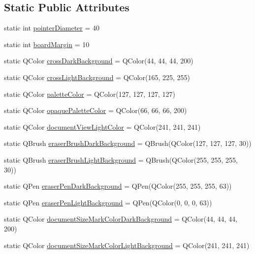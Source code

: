 \subsection*{Static Public Attributes}
\begin{DoxyCompactItemize}
\item 
static int \hyperlink{class_u_b_settings_a5e5079f8062a48661b0a60b3656fc7c1}{pointer\-Diameter} = 40
\item 
static int \hyperlink{class_u_b_settings_aff1d52afbc3bda4b82ad2bba4d7f86b0}{board\-Margin} = 10
\item 
static Q\-Color \hyperlink{class_u_b_settings_abb114084da6714ad6196e6af1a6d2760}{cross\-Dark\-Background} = Q\-Color(44, 44, 44, 200)
\item 
static Q\-Color \hyperlink{class_u_b_settings_a0c8533421b3460c374d4a19a716b2a8a}{cross\-Light\-Background} = Q\-Color(165, 225, 255)
\item 
static Q\-Color \hyperlink{class_u_b_settings_a625a557a8d25f36ff54fa6c7747cee86}{palette\-Color} = Q\-Color(127, 127, 127, 127)
\item 
static Q\-Color \hyperlink{class_u_b_settings_a3b15f9b10941aad5dcc81472fde33ea3}{opaque\-Palette\-Color} = Q\-Color(66, 66, 66, 200)
\item 
static Q\-Color \hyperlink{class_u_b_settings_add3118144065710146552c7f61fdf491}{document\-View\-Light\-Color} = Q\-Color(241, 241, 241)
\item 
static Q\-Brush \hyperlink{class_u_b_settings_ad409d408cad2bec308e795d578ae4e11}{eraser\-Brush\-Dark\-Background} = Q\-Brush(Q\-Color(127, 127, 127, 30))
\item 
static Q\-Brush \hyperlink{class_u_b_settings_a0b82313ebbe4d2fee587f4a59f2a50f6}{eraser\-Brush\-Light\-Background} = Q\-Brush(Q\-Color(255, 255, 255, 30))
\item 
static Q\-Pen \hyperlink{class_u_b_settings_a3bdae429668ae6e3d609a059c8ba5eae}{eraser\-Pen\-Dark\-Background} = Q\-Pen(Q\-Color(255, 255, 255, 63))
\item 
static Q\-Pen \hyperlink{class_u_b_settings_ad3b39d5b3ade1daf61d1dc434be2b61b}{eraser\-Pen\-Light\-Background} = Q\-Pen(Q\-Color(0, 0, 0, 63))
\item 
static Q\-Color \hyperlink{class_u_b_settings_a4cb6c93982e98da81931f1391db0013c}{document\-Size\-Mark\-Color\-Dark\-Background} = Q\-Color(44, 44, 44, 200)
\item 
static Q\-Color \hyperlink{class_u_b_settings_aa78cc4d102e64bef9bbb508e525fde57}{document\-Size\-Mark\-Color\-Light\-Background} = Q\-Color(241, 241, 241)

\end{DoxyCompactItemize}
